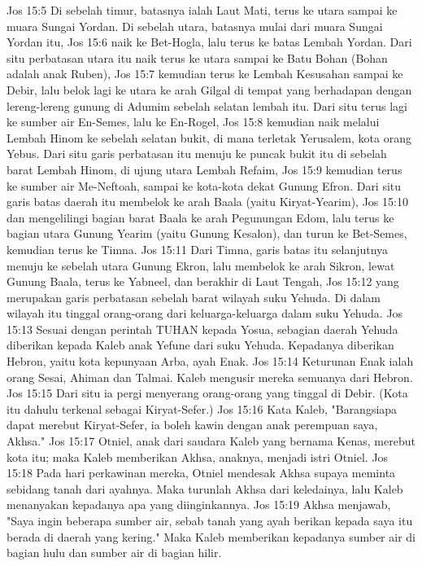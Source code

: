 Jos 15:5  Di sebelah timur, batasnya ialah Laut Mati, terus ke utara sampai ke muara Sungai Yordan. Di sebelah utara, batasnya mulai dari muara Sungai Yordan itu,
Jos 15:6  naik ke Bet-Hogla, lalu terus ke batas Lembah Yordan. Dari situ perbatasan utara itu naik terus ke utara sampai ke Batu Bohan (Bohan adalah anak Ruben),
Jos 15:7  kemudian terus ke Lembah Kesusahan sampai ke Debir, lalu belok lagi ke utara ke arah Gilgal di tempat yang berhadapan dengan lereng-lereng gunung di Adumim sebelah selatan lembah itu. Dari situ terus lagi ke sumber air En-Semes, lalu ke En-Rogel,
Jos 15:8  kemudian naik melalui Lembah Hinom ke sebelah selatan bukit, di mana terletak Yerusalem, kota orang Yebus. Dari situ garis perbatasan itu menuju ke puncak bukit itu di sebelah barat Lembah Hinom, di ujung utara Lembah Refaim,
Jos 15:9  kemudian terus ke sumber air Me-Neftoah, sampai ke kota-kota dekat Gunung Efron. Dari situ garis batas daerah itu membelok ke arah Baala (yaitu Kiryat-Yearim),
Jos 15:10  dan mengelilingi bagian barat Baala ke arah Pegunungan Edom, lalu terus ke bagian utara Gunung Yearim (yaitu Gunung Kesalon), dan turun ke Bet-Semes, kemudian terus ke Timna.
Jos 15:11  Dari Timna, garis batas itu selanjutnya menuju ke sebelah utara Gunung Ekron, lalu membelok ke arah Sikron, lewat Gunung Baala, terus ke Yabneel, dan berakhir di Laut Tengah,
Jos 15:12  yang merupakan garis perbatasan sebelah barat wilayah suku Yehuda. Di dalam wilayah itu tinggal orang-orang dari keluarga-keluarga dalam suku Yehuda.
Jos 15:13  Sesuai dengan perintah TUHAN kepada Yosua, sebagian daerah Yehuda diberikan kepada Kaleb anak Yefune dari suku Yehuda. Kepadanya diberikan Hebron, yaitu kota kepunyaan Arba, ayah Enak.
Jos 15:14  Keturunan Enak ialah orang Sesai, Ahiman dan Talmai. Kaleb mengusir mereka semuanya dari Hebron.
Jos 15:15  Dari situ ia pergi menyerang orang-orang yang tinggal di Debir. (Kota itu dahulu terkenal sebagai Kiryat-Sefer.)
Jos 15:16  Kata Kaleb, "Barangsiapa dapat merebut Kiryat-Sefer, ia boleh kawin dengan anak perempuan saya, Akhsa."
Jos 15:17  Otniel, anak dari saudara Kaleb yang bernama Kenas, merebut kota itu; maka Kaleb memberikan Akhsa, anaknya, menjadi istri Otniel.
Jos 15:18  Pada hari perkawinan mereka, Otniel mendesak Akhsa supaya meminta sebidang tanah dari ayahnya. Maka turunlah Akhsa dari keledainya, lalu Kaleb menanyakan kepadanya apa yang diinginkannya.
Jos 15:19  Akhsa menjawab, "Saya ingin beberapa sumber air, sebab tanah yang ayah berikan kepada saya itu berada di daerah yang kering." Maka Kaleb memberikan kepadanya sumber air di bagian hulu dan sumber air di bagian hilir.
